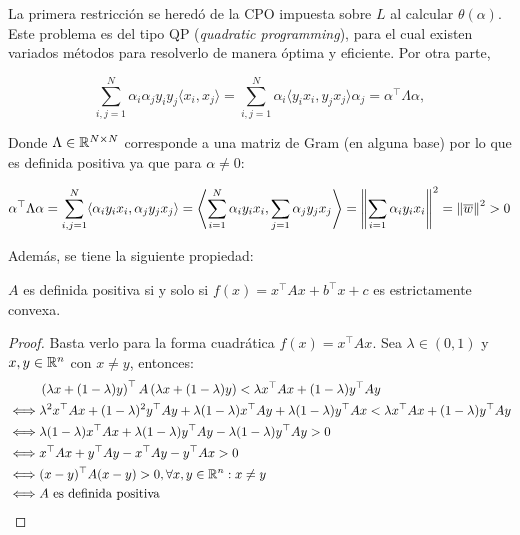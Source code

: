 La primera restricción se heredó de la CPO impuesta sobre $L$ al calcular $\theta(\alpha)$. Este problema es del tipo QP (\emph{quadratic programming}), para el cual existen variados métodos para resolverlo de manera óptima y eficiente. Por otra parte,

\begin{equation}
\sum\limits_{i,j=1}^{N} \alpha_i \alpha_j y_i y_j \langle x_i, x_j\rangle = \sum\limits_{i,j=1}^{N}  \alpha_i \langle   y_i x_i,  y_jx_j\rangle \alpha_j = \alpha^\top \Lambda \alpha,
\end{equation}
 
Donde $\Lambda\in\mathbb{R}^{N\times N}$ corresponde a una matriz de Gram (en alguna base) por lo que es definida positiva ya que para $\alpha\neq 0$:

\begin{equation}
	\alpha^\top \Lambda \alpha = \sum\limits_{i,j=1}^{N}   \langle   \alpha_i y_i x_i,  \alpha_j y_jx_j\rangle = \left\langle\sum\limits_{i=1}^{N}      \alpha_i y_i x_i,  \sum\limits_{j=1} \alpha_j y_jx_j\right\rangle = \left\lVert\sum\limits_{i=1} \alpha_i y_i x_i\right\rVert^2 = \left\lVert\overline{w}\right\rVert^2>0 
\end{equation}

Además, se tiene la siguiente propiedad:

\begin{lemma}
	$A$ es definida positiva si y solo si $f(x)= x^\top Ax + b^\top x + c$ es estrictamente convexa.
\end{lemma}

\begin{proof}
	Basta verlo para la forma cuadrática $f(x)=x^\top Ax$. Sea $\lambda\in (0,1)$ y $x,y\in\mathbb{R}^n$ con $x\neq y$, entonces:
\begin{align*}
	&\left(\lambda x+(1-\lambda)y\right)^\top A \left(\lambda x+(1-\lambda)y\right) <\lambda x^\top Ax + (1-\lambda)y^\top Ay\\
			\iff &\lambda^2 x^\top Ax + (1-\lambda)^2 y^\top Ay + \lambda(1-\lambda)x^\top Ay + \lambda(1-\lambda)y^\top Ax < \lambda x^\top Ax+(1-\lambda)y^\top Ay\\
			\iff & \lambda(1-\lambda)x^\top Ax+\lambda(1-\lambda)y^\top Ay-\lambda(1-\lambda)y^\top Ay> 0\\
			\iff & x^\top Ax+y^\top Ay-x^\top Ay-y^\top Ax> 0\\
			\iff & (x-y)^\top A(x-y)> 0, \forall x,y\in \mathbb{R}^n:x\neq y\\
			\iff &A \text{ es definida positiva}
\end{align*}
\end{proof}

